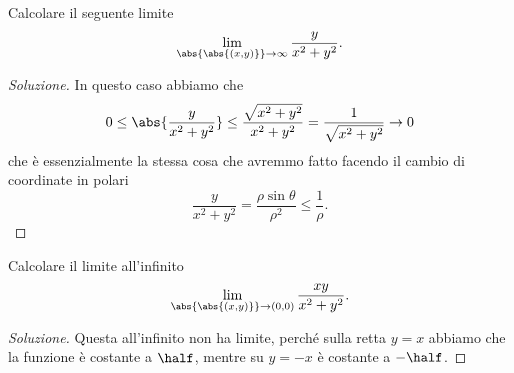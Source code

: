 \documentclass[11pt]{scrartcl}
\begin{document}
	\begin{exercise}
		Calcolare il seguente limite
		$$\lim_{\abs{\abs{(x,y)}}\to \infty}\frac{y}{x^2+y^2}.$$
	\end{exercise}
	\begin{proof}[Soluzione]
		In questo caso abbiamo che
		$$0\le\abs{\frac{y}{x^2+y^2}}\le \frac{\sqrt{x^2+y^2}}{x^2+y^2}=\frac{1}{\sqrt{x^2+y^2}}\to 0$$
		che è essenzialmente la stessa cosa che avremmo fatto facendo il cambio di coordinate in polari
		$$\frac{y}{x^2+y^2}=\frac{\rho\sin\theta}{\rho^2}\le \frac{1}{\rho}.$$
	\end{proof}
	\begin{exercise}
		Calcolare il limite all'infinito
		$$\lim_{\abs{\abs{(x,y)}}\to (0,0)}\frac{xy}{x^2+y^2}.$$
	\end{exercise}
	\begin{proof}[Soluzione]
		Questa all'infinito non ha limite, perché sulla retta $y=x$ abbiamo che la funzione è costante a $\half$, mentre su $y=-x$ è costante a $-\half$.
	\end{proof}
	
\end{document}
